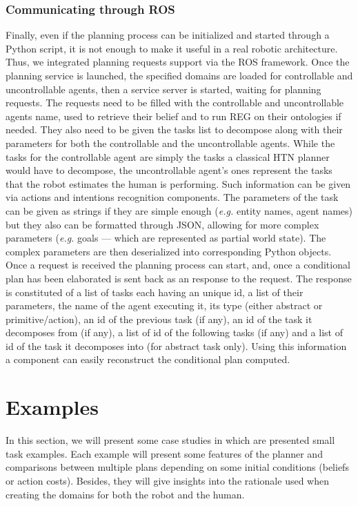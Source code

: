 \documentclass[a4paper,11pt,twoside]{StyleThese}
\begin{document}
\subsubsection{Communicating through ROS}
Finally, even if the planning process can be initialized and started through a Python script, it is not enough to make it useful in a real robotic architecture. Thus, we integrated planning requests support via the ROS framework. 
Once the planning service is launched, the specified domains are loaded for controllable and uncontrollable agents, then a service server is started, waiting for planning requests. 
The requests need to be filled with the controllable and uncontrollable agents name, used to retrieve their belief and to run REG on their ontologies if needed. 
They also need to be given the tasks list to decompose along with their parameters for both the controllable and the uncontrollable agents. While the tasks for the controllable agent are simply the tasks a classical HTN planner would have to decompose, the uncontrollable agent's ones represent the tasks that the robot estimates the human is performing. Such information can be given via actions and intentions recognition components. The parameters of the task can be given as strings if they are simple enough (\textit{e.g.} entity names, agent names) but they also can be formatted through JSON, allowing for more complex parameters (\textit{e.g.} goals --- which are represented as partial world state). The complex parameters are then deserialized into corresponding Python objects.
Once a request is received the planning process can start, and, once a conditional plan has been elaborated is sent back as an response to the request. The response is constituted of a list of tasks each having an unique id, a list of their parameters, the name of the agent executing it, its type (either abstract or primitive/action), an id of the previous task (if any), an id of the task it decomposes from (if any), a list of id of the following tasks (if any) and a list of id of the task it decomposes into (for abstract task only). Using this information a component can easily reconstruct the conditional plan computed.




\section{Examples}
In this section, we will present some case studies in which are presented small task examples. Each example will present some features of the planner and comparisons between multiple plans depending on some initial conditions (beliefs or action costs). Besides, they will give insights into the rationale used when creating the domains for both the robot and the human.
\end{document}
